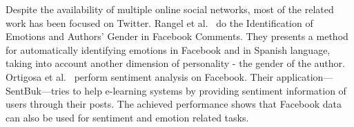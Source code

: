 \documentclass[12pt,a4paper]{report}
\theoremstyle{definition}
\begin{document}
\begin{CJK}{UTF8}{bsmi}
        \par Despite the availability of multiple online social networks, most of the related work has been focused on Twitter. Rangel et al.~\cite{rangel2013emotion}  do the Identification of Emotions and Authors’ Gender in Facebook Comments. They presents a method for automatically identifying emotions in Facebook and in Spanish language, taking into account another dimension of personality - the gender of the author.
        Ortigosa et al.~\cite{ortigosa2014sentiment}  perform sentiment analysis on Facebook. Their application—SentBuk—tries to help e-learning systems by providing sentiment information of users through their posts. The achieved performance shows that Facebook data can also be used for sentiment and emotion related tasks.
        

\end{CJK}
\end{document}
